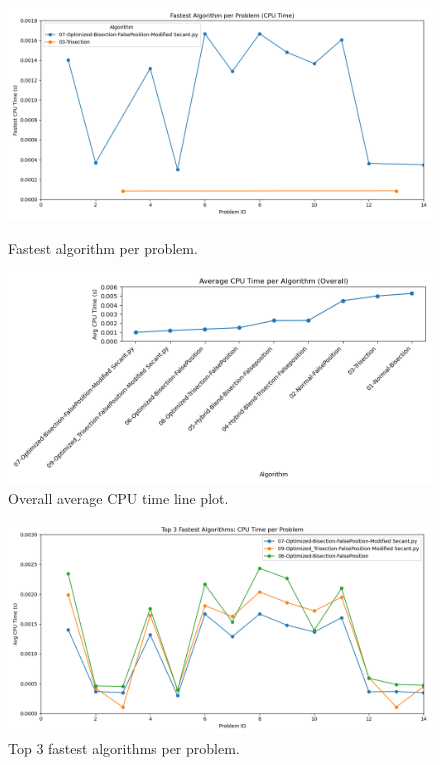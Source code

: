 \documentclass[amsmath, amssymb, aps]{revtex4-2}
\begin{document}
\begin{figure}[H]
    \centering
    \begin{minipage}{\linewidth}
        \centering
        \includegraphics[width=0.8\linewidth]{fastest_algorithm_per_problem_lineplot.png}
        \caption{Fastest algorithm per problem.}
        \label{fig:fastest_algorithm}
    \end{minipage}
    \vspace{-10pt} 
    \begin{minipage}{\linewidth}
        \centering
        \includegraphics[width=0.8\linewidth]{avg_cpu_time_lineplot_overall.png}
        \caption{Overall average CPU time line plot.}
        \label{fig:avg_cpu_time_overall}
    \end{minipage}
\end{figure}

\begin{figure}[H]
    \centering
    \includegraphics[width=0.8\linewidth]{top3_fastest_algorithms_lineplot.png}
    \caption{Top 3 fastest algorithms per problem.}
    \label{fig:top3_fastest}
\end{figure}
\end{document}
